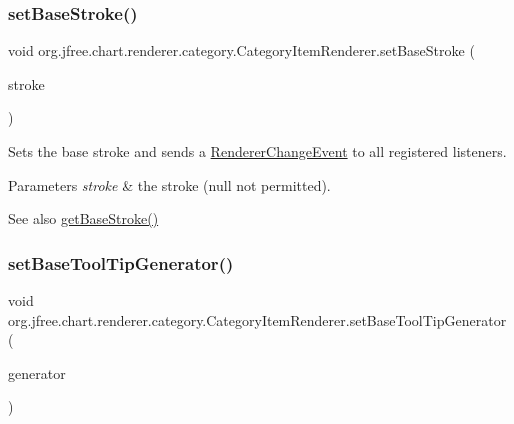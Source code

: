\subsubsection{\texorpdfstring{set\+Base\+Stroke()}{setBaseStroke()}}
{\footnotesize\ttfamily void org.\+jfree.\+chart.\+renderer.\+category.\+Category\+Item\+Renderer.\+set\+Base\+Stroke (\begin{DoxyParamCaption}\item[{Stroke}]{stroke }\end{DoxyParamCaption})}

Sets the base stroke and sends a \mbox{\hyperlink{}{Renderer\+Change\+Event}} to all registered listeners.


\begin{DoxyParams}{Parameters}
{\em stroke} & the stroke ({\ttfamily null} not permitted).\\
\hline
\end{DoxyParams}
\begin{DoxySeeAlso}{See also}
\mbox{\hyperlink{interfaceorg_1_1jfree_1_1chart_1_1renderer_1_1category_1_1_category_item_renderer_a0a7eacce926274d0557216f6f570435c}{get\+Base\+Stroke()}} 
\end{DoxySeeAlso}
\mbox{\label{interfaceorg_1_1jfree_1_1chart_1_1renderer_1_1category_1_1_category_item_renderer_a8278a41153ebf3551e122550476ab646}} 
\subsubsection{\texorpdfstring{set\+Base\+Tool\+Tip\+Generator()}{setBaseToolTipGenerator()}}
{\footnotesize\ttfamily void org.\+jfree.\+chart.\+renderer.\+category.\+Category\+Item\+Renderer.\+set\+Base\+Tool\+Tip\+Generator (\begin{DoxyParamCaption}\item[{\mbox{\hyperlink{interfaceorg_1_1jfree_1_1chart_1_1labels_1_1_category_tool_tip_generator}{Category\+Tool\+Tip\+Generator}}}]{generator }\end{DoxyParamCaption})}

